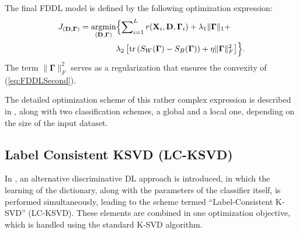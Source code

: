 \documentclass[journal]{IEEEtran}
\newcommand{\bD}{\mathbf{D}}
\newcommand{\bX}{\mathbf{X}}
\newcommand{\bGamma}{\boldsymbol{\Gamma}}
\begin{document}
The final FDDL model is defined by the following optimization expression:
\begin{equation}\label{eq:FDDLFinal}
\begin{aligned}
     J_{\left(\bD,\bGamma\right)}= \underset{(\bD,\bGamma)}{\text{argmin}} &\Bigl \{ \sum\nolimits_{i=1}^L{r(\bX_i,\bD,\bGamma_i)}+\lambda_1 \|\bGamma\|_1 + \\
    & \lambda_2 \left[\text{tr}\left(S_W(\bGamma)-S_B(\bGamma)\right) + \eta \|\bGamma\|_F^2 \right]\Bigr \}.
\end{aligned}
\end{equation}
The term $\|\bGamma\|_F^2$ serves as a regularization that ensures the convexity of (\ref{eq:FDDLSecond}).

The detailed optimization scheme of this rather complex expression is described in \cite{FDDL}, along with two classification schemes, a global and a local one, depending on the size of the input dataset.

\subsection{Label Consistent KSVD (LC-KSVD)} \label{SS:LCKSVD}

In \cite{LCKSVD,LCKSVD2}, an alternative discriminative DL approach is introduced, in which the learning of the dictionary, along with the parameters of the classifier itself, is performed simultaneously, leading to the scheme termed ``Label-Consistent K-SVD'' (LC-KSVD). These elements are combined in one optimization objective, which is handled using the standard K-SVD algorithm.

\end{document}
